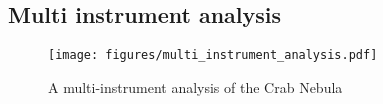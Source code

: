 \subsection{Multi instrument analysis}
\label{ssec:multi-instrument-analysis}


\begin{figure*}[t]
	\sidecaption
	\texttt{[image: figures/multi\_instrument\_analysis.pdf]}
	\caption{A multi-instrument analysis of the Crab Nebula}
	\label{fig:multi_instrument_analysis}
\end{figure*}
